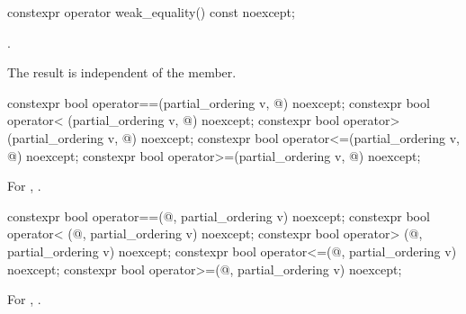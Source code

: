 %
\begin{itemdecl}
constexpr operator weak_equality() const noexcept;
\end{itemdecl}

\begin{itemdescr}
\pnum
\returns
{}.
\begin{note}
The result is independent of the  member.
\end{note}
\end{itemdescr}

%
%
%
%
%
\begin{itemdecl}
constexpr bool operator==(partial_ordering v, @\unspec@) noexcept;
constexpr bool operator< (partial_ordering v, @\unspec@) noexcept;
constexpr bool operator> (partial_ordering v, @\unspec@) noexcept;
constexpr bool operator<=(partial_ordering v, @\unspec@) noexcept;
constexpr bool operator>=(partial_ordering v, @\unspec@) noexcept;
\end{itemdecl}

\begin{itemdescr}
\pnum
\returns
For , .
\end{itemdescr}

%
%
%
%
%
\begin{itemdecl}
constexpr bool operator==(@\unspec@, partial_ordering v) noexcept;
constexpr bool operator< (@\unspec@, partial_ordering v) noexcept;
constexpr bool operator> (@\unspec@, partial_ordering v) noexcept;
constexpr bool operator<=(@\unspec@, partial_ordering v) noexcept;
constexpr bool operator>=(@\unspec@, partial_ordering v) noexcept;
\end{itemdecl}

\begin{itemdescr}
\pnum
\returns
For , .
\end{itemdescr}

